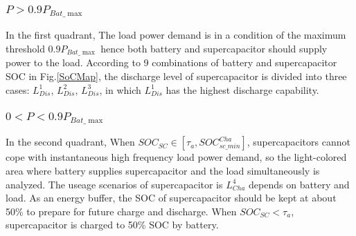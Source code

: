 \documentclass[energies,article,submit,moreauthors,pdftex,10pt,a4paper]{Definitions/mdpi}
\begin{document}
\subsubsection{${P>0.9P_{Bat\_\max }}$}
In the first quadrant, 
The load power demand is in a condition of the maximum threshold
${0.9P_{Bat\_\max }}$ hence both battery and supercapacitor should supply power to the load.
According to 9 combinations of battery and supercapacitor SOC in Fig.\ref{SoCMap}, the discharge level of supercapacitor is divided into three cases: $ L_{Dis}^1$, $ L_{Dis}^2$, $ L_{Dis}^3$, in which $ L_{Dis}^1$ has the highest discharge capability.

 \subsubsection{${0<P<0.9P_{Bat\_\max }}$}
In the second quadrant,
When $SO{C_{SC}} \in \left[ {{\tau _a},SOC_{sc\_min}^{Cha}} \right]$, supercapacitors cannot cope with instantaneous high frequency load power demand, so
the light-colored area where battery supplies supercapacitor and the load simultaneously is analyzed.
The useage scenarios of supercapacitor is $L_{Cha}^4$ depends on battery and load.
 As an energy buffer, the SOC of supercapacitor should be kept at about 50\% to prepare for future charge and discharge. 
When   ${SOC _{SC}<\tau _{a}}$, supercapacitor is charged to 50\% SOC by battery.

\end{document}
